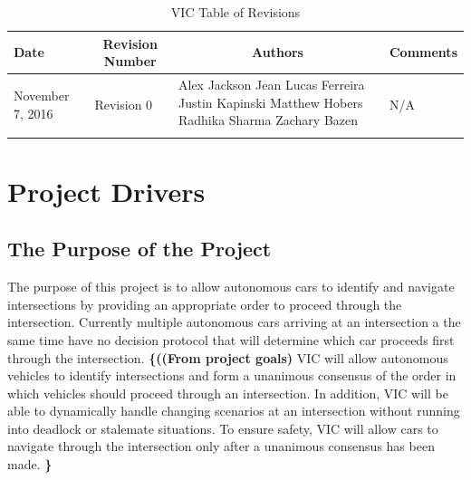 \documentclass [12pt]{article}
\begin{document}
\thispagestyle{empty}
\begin{longtable}{| p{ } | p{ } | p{ } | p{ } |}

\hline 
\centering \textbf{Date} & 
\multicolumn{1}{c}{\textbf {Revision Number}} &
\multicolumn{1}{|c}{\textbf {Authors}} & 
\multicolumn{1}{|c|}{\textbf {Comments}} \\ \hline

\multirow{4}{*}{\centering November 7, 2016}  & 
\multirow{4}{*}{Revision 0}& 
{Alex Jackson \newline
Jean Lucas Ferreira \newline
Justin Kapinski\newline
Matthew Hobers\newline
Radhika Sharma\newline
Zachary Bazen}
&
 \multirow{4}{*}{N/A} \\ 
\hline 

\caption{VIC Table of Revisions} 
\end{longtable}
\pagebreak



\section {\textbf{Project Drivers}}


\subsection{The Purpose of the Project} 
The purpose of this project is to allow autonomous cars to identify and navigate intersections by providing an appropriate order to proceed through the intersection. Currently multiple autonomous cars arriving at an intersection a the same time have no decision protocol that will determine which car proceeds first through the intersection.  \textbf{\{((From project goals)}
VIC will allow autonomous vehicles to identify intersections and form a unanimous consensus
of the order in which vehicles should proceed through an intersection. In addition, VIC will be
able to dynamically handle changing scenarios at an intersection without running into deadlock
or stalemate situations. To ensure safety, VIC will allow cars to navigate through the intersection
only after a unanimous consensus has been made. \textbf{\}}
\end{document}
